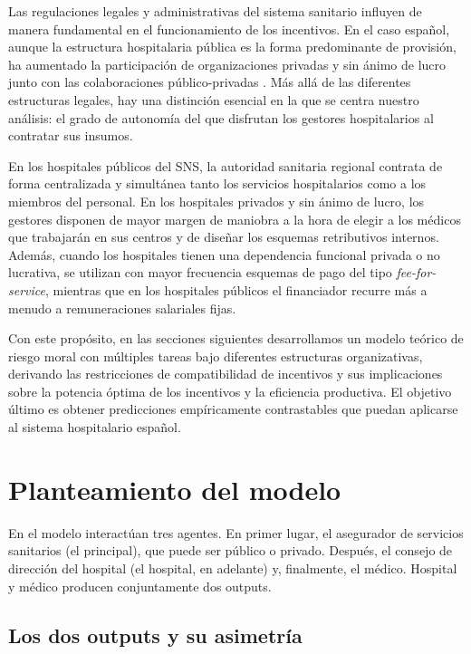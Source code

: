 \documentclass[12pt, a4paper, twoside, openright]{book}
\theoremstyle{plain}
\theoremstyle{definition}
\theoremstyle{remark}
\begin{document}
Las regulaciones legales y administrativas del sistema sanitario influyen de manera fundamental en el funcionamiento de los incentivos. En el caso español, aunque la estructura hospitalaria pública es la forma predominante de provisión, ha aumentado la participación de organizaciones privadas y sin ánimo de lucro junto con las colaboraciones público-privadas \citep{repullo2008}. Más allá de las diferentes estructuras legales, hay una distinción esencial en la que se centra nuestro análisis: el grado de autonomía del que disfrutan los gestores hospitalarios al contratar sus insumos.

En los hospitales públicos del SNS, la autoridad sanitaria regional contrata de forma centralizada y simultánea tanto los servicios hospitalarios como a los miembros del personal. En los hospitales privados y sin ánimo de lucro, los gestores disponen de mayor margen de maniobra a la hora de elegir a los médicos que trabajarán en sus centros y de diseñar los esquemas retributivos internos. Además, cuando los hospitales tienen una dependencia funcional privada o no lucrativa, se utilizan con mayor frecuencia esquemas de pago del tipo \textit{fee-for-service}, mientras que en los hospitales públicos el financiador recurre más a menudo a remuneraciones salariales fijas.

Con este propósito, en las secciones siguientes desarrollamos un modelo teórico de riesgo moral con múltiples tareas bajo diferentes estructuras organizativas, derivando las restricciones de compatibilidad de incentivos y sus implicaciones sobre la potencia óptima de los incentivos y la eficiencia productiva. El objetivo último es obtener predicciones empíricamente contrastables que puedan aplicarse al sistema hospitalario español.


\section{Planteamiento del modelo}
\label{sec:planteamiento}

En el modelo interactúan tres agentes. En primer lugar, el asegurador de servicios sanitarios (el principal), que puede ser público o privado. Después, el consejo de dirección del hospital (el hospital, en adelante) y, finalmente, el médico. Hospital y médico producen conjuntamente dos outputs.

\subsection{Los dos outputs y su asimetría}
\end{document}
